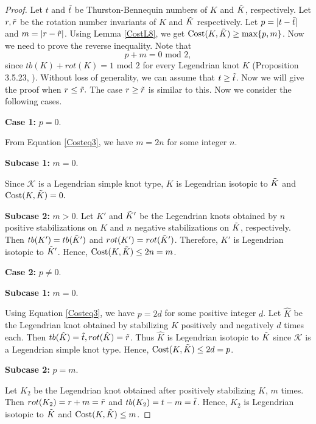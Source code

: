 \documentclass[11pt]{amsart}
\numberwithin{equation}{section}
\theoremstyle{plain}
\theoremstyle{definition}
\theoremstyle{remark} \newtheorem{remark}[equation]{Remark}
\theoremstyle{remark} \newtheorem{observation}[equation]{Observation}
\newcommand{\Cost}{\text{Cost}}
\DeclarePairedDelimiter{\abs}{\lvert}{\rvert}%
\begin{document}
\begin{proof}
 Let $t$ and $\Tilde{t}$ be Thurston-Bennequin numbers of $K$ and $\Tilde{K}$, respectively. Let $r,\Tilde{r}$ be the rotation number invariants of $K$ and $\Tilde{K}$ respectively. Let $p=\abs{t-\Tilde{t}}$ and $m=\abs{r-\Tilde{r}}$.
Using Lemma \ref{CostL8}, we get $\Cost(K,\Tilde{K})\geq \max\{p,m\}$. Now we need to prove the reverse inequality. Note that
\begin{equation}\label{Costeq3}
    p+m=0 \text{ mod }2,
\end{equation} 
since $tb(K)+rot(K)=1 \text{ mod }2$ for every Legendrian knot $K$ (Proposition 3.5.23, \cite{GCT}). Without loss of generality, we can assume that $t\geq\Tilde{t}$. Now we will give the proof when $r\leq \Tilde{r}.$ The case $r\geq \Tilde{r}$ is similar to this. Now we consider the following cases.

\noindent \textbf{Case 1:} $p=0$.

From Equation \ref{Costeq3}, we have $m=2n$ for some integer $n.$

\noindent \textbf{Subcase 1:} $m=0$.

Since $\mathcal{K}$ is a Legendrian simple knot type, $K$ is Legendrian isotopic to $\Tilde{K}$ and $\Cost(K,\Tilde{K})=0.$

\noindent \textbf{Subcase 2:} $m>0$.
 Let $K'$ and $\Tilde{K}'$ be the Legendrian knots obtained by $n$ positive stabilizations on $K$ and $n$ negative stabilizations on $\Tilde{K}$, respectively. Then $tb(K')=tb(\Tilde{K}')$ and $rot(K')=rot(\Tilde{K}')$. Therefore, $K'$ is Legendrian isotopic to $\Tilde{K}'$. Hence, $\Cost(K,\Tilde{K})\leq 2n=m$.

\noindent \textbf{Case 2:} $p\ne 0$.

\noindent \textbf{Subcase 1:} $m=0$.

Using Equation \ref{Costeq3}, we have $p=2d$ for some positive integer $d$. Let $\hat{K}$ be the Legendrian knot obtained by stabilizing $K$ positively and negatively $d$ times each. Then $tb(\hat{K})=\Tilde{t}, rot(\hat{K})=\Tilde{r}$. Thus $\hat{K}$ is Legendrian isotopic to $\Tilde{K}$ since $\mathcal{K}$ is a Legendrian simple knot type. Hence, $\Cost(K,\Tilde{K})\leq 2d=p$.



\noindent \textbf{Subcase 2:} $p=m$.

 Let $K_2$ be the Legendrian knot obtained after positively stabilizing $K$, $m$ times. Then $rot(K_2)=r+m=\Tilde{r}$ and $tb(K_2)=t-m=\Tilde{t}$. Hence, $K_2$ is Legendrian isotopic to $\Tilde{K}$ and $\Cost(K,\Tilde{K})\leq m$. 



\end{proof}
\end{document}
